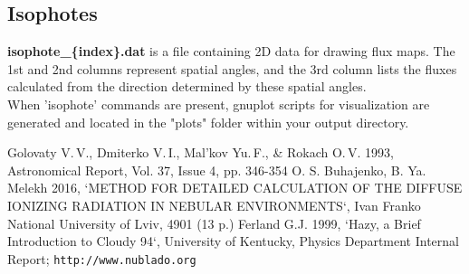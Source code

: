 \documentclass[a4paper]{article}
\begin{document}
\subsection{Isophotes}

{\bf isophote\_\{index\}.dat} is a file containing 2D data for drawing flux maps.
The 1st and 2nd columns represent spatial angles, and the 3rd column lists the fluxes calculated from the direction determined by these spatial angles. \\

When 'isophote' commands are present, gnuplot scripts for visualization are generated and located in the "plots"
folder within your output directory.


\begin{thebibliography}{3}
{\small
{} Golovaty V.\,V., Dmiterko V.\,I., Mal'kov Yu.\,F., \& Rokach O.\,V. 1993, Astronomical Report, Vol. 37, Issue 4, pp. 346-354
 O. S. Buhajenko, B. Ya. Melekh 2016, `METHOD FOR DETAILED CALCULATION OF THE DIFFUSE IONIZING RADIATION IN NEBULAR ENVIRONMENTS`, Ivan Franko National University of Lviv, 4901 (13 p.) 
 Ferland G.J. 1999, `Hazy, a Brief Introduction to Cloudy 94`, University of Kentucky, Physics Department Internal Report; \texttt{http://www.nublado.org}
}
\end{thebibliography}
\end{document}
